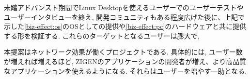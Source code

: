 未踏アドバンスト期間でLinux Desktopを使えるユーザーでのユーザーテストやユーザーインタビューを終え, 開発コミュニティもある程度広げた後に、上記で示した\ref{biz-effect:os}のOSとしての提供や\ref{biz-effect:pc}のハードウェアと共に提供する形を検証する.
これらのターゲットとなるユーザーは膨大で, 

本提案はネットワーク効果が働くプロジェクトである.
具体的には, ユーザー数が増えれば増えるほど, ZIGENのアプリケーションの開発者が増え、より高品質なアプリケーションを使えるようになる.
それらはユーザーを増やす一助となる.
